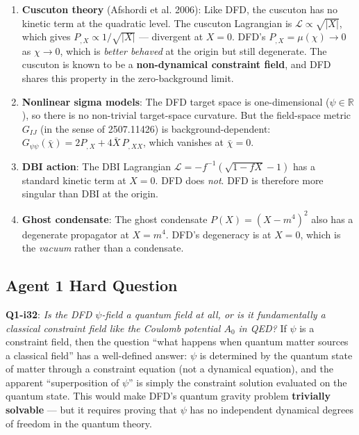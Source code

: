 \documentclass[11pt,a4paper]{article}
\begin{document}
\begin{enumerate}
\item \textbf{Cuscuton theory} (Afshordi et al. 2006): Like DFD, the cuscuton has no kinetic term at the quadratic level. The cuscuton Lagrangian is $\mathcal{L} \propto \sqrt{|X|}$, which gives $P_{,X} \propto 1/\sqrt{|X|}$ --- divergent at $X=0$. DFD's $P_{,X} = \mu(\chi) \to 0$ as $\chi \to 0$, which is \emph{better behaved} at the origin but still degenerate. The cuscuton is known to be a \textbf{non-dynamical constraint field}, and DFD shares this property in the zero-background limit.

\item \textbf{Nonlinear sigma models}: The DFD target space is one-dimensional ($\psi \in \mathbb{R}$), so there is no non-trivial target-space curvature. But the field-space metric $G_{IJ}$ (in the sense of 2507.11426) is background-dependent: $G_{\psi\psi}(\bar\chi) = 2P_{,X} + 4\bar{X}\,P_{,XX}$, which vanishes at $\bar\chi = 0$.

\item \textbf{DBI action}: The DBI Lagrangian $\mathcal{L} = -f^{-1}(\sqrt{1-fX}-1)$ has a standard kinetic term at $X=0$. DFD does \emph{not}. DFD is therefore more singular than DBI at the origin.

\item \textbf{Ghost condensate}: The ghost condensate $P(X) = (X-m^4)^2$ also has a degenerate propagator at $X = m^4$. DFD's degeneracy is at $X = 0$, which is the \emph{vacuum} rather than a condensate.
\end{enumerate}

\subsection{Agent 1 Hard Question}

\textbf{Q1-i32}: \emph{Is the DFD $\psi$-field a quantum field at all, or is it fundamentally a classical constraint field like the Coulomb potential $A_0$ in QED?} If $\psi$ is a constraint field, then the question ``what happens when quantum matter sources a classical field'' has a well-defined answer: $\psi$ is determined by the quantum state of matter through a constraint equation (not a dynamical equation), and the apparent ``superposition of $\psi$'' is simply the constraint solution evaluated on the quantum state. This would make DFD's quantum gravity problem \textbf{trivially solvable} --- but it requires proving that $\psi$ has no independent dynamical degrees of freedom in the quantum theory.
\end{document}
